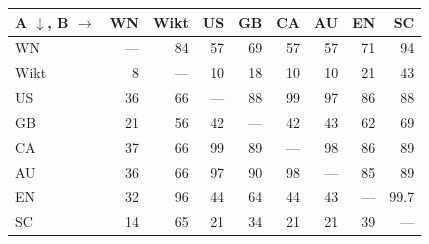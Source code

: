\begin{tabular}{lrrrrrrrr}
\toprule
A $\downarrow$, B $\rightarrow$ & WN & Wikt & US & GB & CA & AU & EN & SC \\
\midrule
WN & --- & 84 & 57 & 69 & 57 & 57 & 71 & 94 \\
Wikt & 8 & --- & 10 & 18 & 10 & 10 & 21 & 43 \\
US & 36 & 66 & --- & 88 & 99 & 97 & 86 & 88 \\
GB & 21 & 56 & 42 & --- & 42 & 43 & 62 & 69 \\
CA & 37 & 66 & 99 & 89 & --- & 98 & 86 & 89 \\
AU & 36 & 66 & 97 & 90 & 98 & --- & 85 & 89 \\
EN & 32 & 96 & 44 & 64 & 44 & 43 & --- & 99.7 \\
SC & 14 & 65 & 21 & 34 & 21 & 21 & 39 & --- \\
\bottomrule
\end{tabular}
